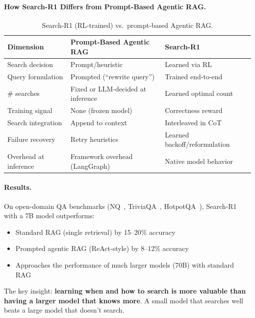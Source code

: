 \paragraph{How Search-R1 Differs from Prompt-Based Agentic RAG.}
\label{how-search-r1-differs-from-prompt-based-agentic-rag.}

\begin{table}[ht!]
\centering
\caption{Search-R1 (RL-trained) vs.~prompt-based Agentic RAG.}
\begin{tabular}{@{}lp{5cm}p{8cm}@{}}
\toprule
\textbf{Dimension} & \textbf{Prompt-Based Agentic RAG} & \textbf{Search-R1} \\
\midrule
Search decision & Prompt/heuristic & Learned via RL \\
Query formulation & Prompted (``rewrite query'') & Trained end-to-end \\
\# searches & Fixed or LLM-decided at inference & Learned optimal count \\
Training signal & None (frozen model) & Correctness reward \\
Search integration & Append to context & Interleaved in CoT \\
Failure recovery & Retry heuristics & Learned backoff/reformulation \\
Overhead at inference & Framework overhead (LangGraph) & Native model behavior \\
\bottomrule
\end{tabular}
\end{table}

\paragraph{Results.}
\label{results.-1}

On open-domain QA benchmarks (NQ~\cite{kwiatkowski2019natural}, TriviaQA~\cite{joshi2017triviaqa}, HotpotQA~\cite{yang2018hotpotqa}), Search-R1 with a 7B model outperforms:

\begin{itemize}
  \item Standard RAG (single retrieval) by 15--20\% accuracy
  \item Prompted agentic RAG (ReAct-style) by 8--12\% accuracy
  \item Approaches the performance of much larger models (70B) with standard RAG
\end{itemize}

The key insight: \textbf{learning when and how to search is more valuable than having a larger model that knows more}. A small model that searches well beats a large model that doesn’t search.

